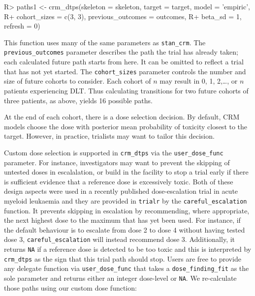 \documentclass[article]{jss}
\begin{document}
\begin{CodeChunk}

\begin{CodeInput}
R> paths1 <- crm_dtps(skeleton = skeleton, target = target, model = 'empiric', 
R+                    cohort_sizes = c(3, 3), previous_outcomes = outcomes,
R+                    beta_sd = 1, refresh = 0)
\end{CodeInput}
\end{CodeChunk}

This function uses many of the same parameters as \texttt{stan\_crm}.
The \texttt{previous\_outcomes} parameter describes the path the trial
has already taken; each calculated future path starts from here. It can
be omitted to reflect a trial that has not yet started. The
\texttt{cohort\_sizes} parameter controls the number and size of future
cohorts to consider. Each cohort of \(n\) may result in 0, 1,
2,\ldots{}, or \(n\) patients experiencing DLT. Thus calculating
transitions for two future cohorts of three patients, as above, yields
16 possible paths.

At the end of each cohort, there is a dose selection decision. By
default, CRM models choose the dose with posterior mean probability of
toxicity closest to the target. However, in practice, trialists may want
to tailor this decision.

Custom dose selection is supported in \texttt{crm\_dtps} via the
\texttt{user\_dose\_func} parameter. For instance, investigators may
want to prevent the skipping of untested doses in escalalation, or build
in the facility to stop a trial early if there is sufficient evidence
that a reference dose is excessively toxic. Both of these design aspects
were used in a recently published dose-escalation trial in acute myeloid
leukaemia \citep{craddockCombinationLenalidomideAzacitidine2019} and
they are provided in \texttt{trialr} by the \texttt{careful\_escalation}
function. It prevents skipping in escalation by recommending, where
appropriate, the next highest dose to the maximum that has yet been
used. For instance, if the default behaviour is to escalate from dose 2
to dose 4 without having tested dose 3, \texttt{careful\_escalation}
will instead recommend dose 3. Additionally, it returns \texttt{NA} if a
reference dose is detected to be too toxic and this is interpreted by
\texttt{crm\_dtps} as the sign that this trial path should stop. Users
are free to provide any delegate function via \texttt{user\_dose\_func}
that takes a \texttt{dose\_finding\_fit} as the sole parameter and
returns either an integer dose-level or \texttt{NA}. We re-calculate
those paths using our custom dose function:
\end{document}
